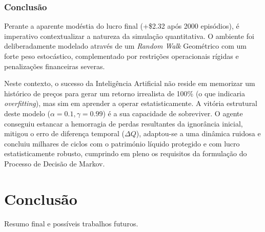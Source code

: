 \documentclass[12pt,a4paper]{article}
\begin{document}
\subsubsection{Conclusão}

Perante a aparente modéstia do lucro final (+\$2.32 após 2000 episódios), é imperativo contextualizar a natureza da simulação
quantitativa. O ambiente foi deliberadamente modelado através de um \textit{Random Walk} Geométrico com um forte peso estocástico,
complementado por restrições operacionais rígidas e penalizações financeiras severas.

Neste contexto, o sucesso da Inteligência Artificial não reside em memorizar um histórico de preços para gerar um retorno irrealista
de 100\% (o que indicaria \textit{overfitting}), mas sim em aprender a operar estatisticamente. A vitória estrutural deste modelo
($\alpha=0.1, \gamma=0.99$) é a sua capacidade de sobreviver. O agente conseguiu estancar a hemorragia de perdas resultantes da
ignorância inicial, mitigou o erro de diferença temporal ($\Delta Q$), adaptou-se a uma dinâmica ruidosa e concluiu milhares
de ciclos com o património líquido protegido e com lucro estatisticamente robusto, cumprindo em pleno os requisitos da formulação
do Processo de Decisão de Markov.
\section{Conclusão}
Resumo final e possíveis trabalhos futuros.


\end{document}
